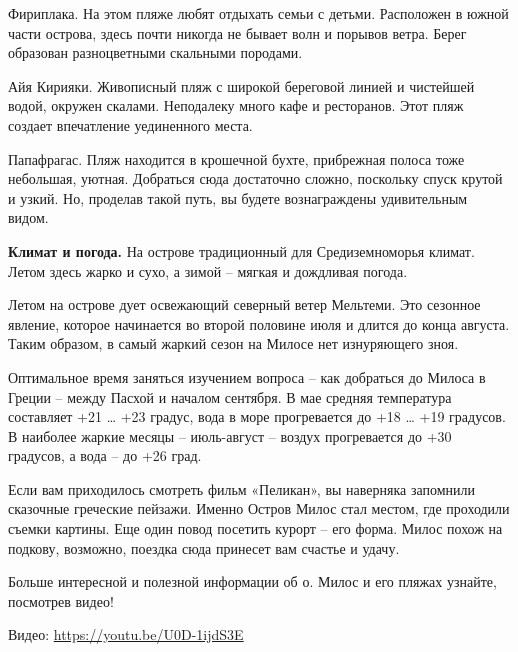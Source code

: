 Фириплака. На этом пляже любят отдыхать семьи с детьми. Расположен в южной части острова, здесь почти никогда не бывает волн и порывов ветра. Берег образован разноцветными скальными породами.

Айя Кирияки. Живописный пляж с широкой береговой линией и чистейшей водой, окружен скалами. Неподалеку много кафе и ресторанов. Этот пляж создает впечатление уединенного места.

Папафрагас. Пляж находится в крошечной бухте, прибрежная полоса тоже небольшая, уютная. Добраться сюда достаточно сложно, поскольку спуск крутой и узкий. Но, проделав такой путь, вы будете вознаграждены удивительным видом.

\textbf{Климат и погода.}
На острове традиционный для Средиземноморья климат. Летом здесь жарко и сухо, а зимой – мягкая и дождливая погода.

Летом на острове дует освежающий северный ветер Мельтеми. Это сезонное явление, которое начинается во второй половине июля и длится до конца августа. Таким образом, в самый жаркий сезон на Милосе нет изнуряющего зноя.

Оптимальное время заняться изучением вопроса – как добраться до Милоса в Греции – между Пасхой и началом сентября. В мае средняя температура составляет +21 … +23 градус, вода в море прогревается до +18 … +19 градусов. В наиболее жаркие месяцы – июль-август – воздух прогревается до +30 градусов, а вода – до +26 град.

Если вам приходилось смотреть фильм «Пеликан», вы наверняка запомнили сказочные греческие пейзажи. Именно Остров Милос стал местом, где проходили съемки картины. Еще один повод посетить курорт – его форма. Милос похож на подкову, возможно, поездка сюда принесет вам счастье и удачу.

Больше интересной и полезной информации об о. Милос и его пляжах узнайте, посмотрев видео!

Видео: \url{https://youtu.be/U0D-1ijdS3E}




